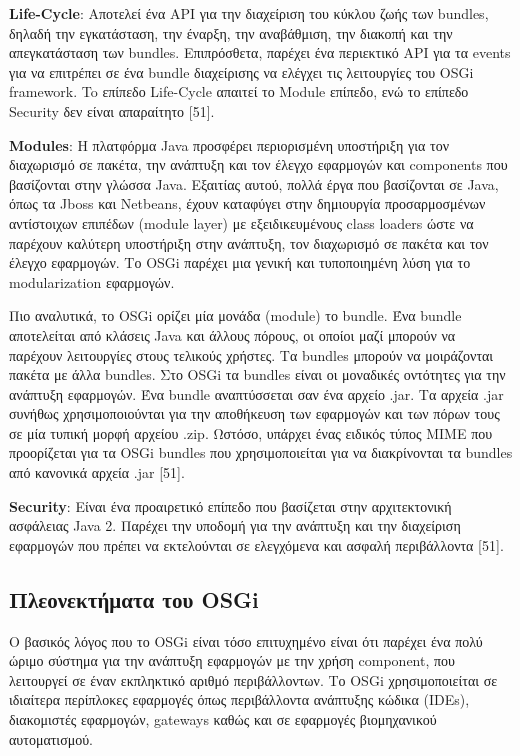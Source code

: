\textbf{Life-Cycle}: Αποτελεί ένα API για την διαχείριση του κύκλου ζωής των bundles, δηλαδή την εγκατάσταση, την έναρξη, την αναβάθμιση, την διακοπή και την απεγκατάσταση των bundles. Επιπρόσθετα,  παρέχει ένα περιεκτικό API για τα events για να επιτρέπει σε ένα bundle διαχείρισης να ελέγχει τις λειτουργίες του OSGi framework. To επίπεδο Life-Cycle απαιτεί το Module επίπεδο, ενώ το επίπεδο Security δεν είναι απαραίτητο [51]. 

\textbf{Modules}:  Η πλατφόρμα Java προσφέρει περιορισμένη υποστήριξη για τον διαχωρισμό σε πακέτα, την ανάπτυξη και τον έλεγχο εφαρμογών και components που βασίζονται στην γλώσσα Java. Εξαιτίας αυτού, πολλά έργα που βασίζονται σε Java, όπως τα  Jboss και Netbeans, έχουν καταφύγει στην δημιουργία προσαρμοσμένων αντίστοιχων επιπέδων (module layer) με εξειδικευμένους class loaders ώστε να παρέχουν καλύτερη υποστήριξη στην ανάπτυξη, τον διαχωρισμό σε πακέτα και τον έλεγχο εφαρμογών. Το OSGi παρέχει μια γενική και τυποποιημένη λύση για το modularization εφαρμογών.  

	Πιο αναλυτικά, το OSGi ορίζει μία μονάδα (module) το bundle. Ένα bundle αποτελείται από κλάσεις Java και άλλους πόρους, οι οποίοι μαζί μπορούν να παρέχουν λειτουργίες στους τελικούς χρήστες. Τα bundles μπορούν να μοιράζονται πακέτα με άλλα bundles. Στο OSGi τα bundles είναι οι μοναδικές οντότητες για την ανάπτυξη εφαρμογών. Ένα bundle αναπτύσσεται σαν ένα αρχείο .jar. Τα αρχεία .jar συνήθως χρησιμοποιούνται για την αποθήκευση των εφαρμογών και των πόρων τους σε μία τυπική μορφή αρχείου .zip. Ωστόσο, υπάρχει ένας ειδικός τύπος ΜΙΜΕ που προορίζεται για τα OSGi bundles που χρησιμοποιείται για να διακρίνονται τα bundles από κανονικά αρχεία .jar [51]. 

\textbf{Security}: Είναι ένα προαιρετικό επίπεδο που βασίζεται στην αρχιτεκτονική ασφάλειας Java 2. Παρέχει την υποδομή για την ανάπτυξη και την διαχείριση εφαρμογών που πρέπει να εκτελούνται σε ελεγχόμενα και ασφαλή περιβάλλοντα [51]. 

\subsection{Πλεονεκτήματα του OSGi}

Ο βασικός λόγος που το OSGi είναι τόσο επιτυχημένο είναι ότι παρέχει ένα πολύ ώριμο σύστημα για την ανάπτυξη εφαρμογών με την χρήση component, που λειτουργεί σε έναν εκπληκτικό αριθμό περιβάλλοντων. Το OSGi χρησιμοποιείται σε ιδιαίτερα περίπλοκες εφαρμογές όπως περιβάλλοντα ανάπτυξης κώδικα (IDEs), διακομιστές εφαρμογών, gateways καθώς και σε εφαρμογές βιομηχανικού αυτοματισμού. 

